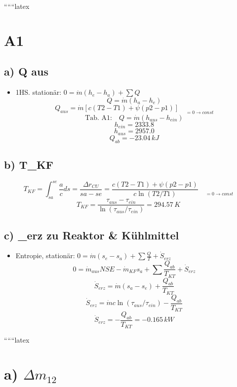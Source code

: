 
``````latex


\section*{A1}

\subsection*{a) Q aus}

\begin{itemize}
    \item 1HS. stationär: \(0 = \dot{m} (h_e - h_a) + \sum Q\)
    \[
    Q = \dot{m} (h_a - h_e)
    \]
    \[
    Q_{aus} = \dot{m} \left[ c (T2 - T1) + \psi (p2 - p1) \right] \quad \underset{=0 \rightarrow const}{}
    \]
    \[
    \text{Tab. A1:} \quad Q = \dot{m} (h_{aus} - h_{ein})
    \]
    \[
    h_{ein} = 2333.8
    \]
    \[
    h_{aus} = 2957.0
    \]
    \[
    Q_{ab} = -23.04 \, kJ
    \]
\end{itemize}

\subsection*{b) T_{KF}}

\[
T_{KF} = \int_{sa}^{se} \frac{a}{c} ds = \frac{\Delta r_{CU}}{sa - se} = \frac{c (T2 - T1) + \psi (p2 - p1)}{c \ln (T2 / T1)} \quad \underset{=0 \rightarrow const}{}
\]
\[
T_{KF} = \frac{\tau_{aus} - \tau_{ein}}{\ln (\tau_{aus} / \tau_{ein})} = 294.57 \, K
\]

\subsection*{c) _{erz} zu Reaktor \& Kühlmittel}

\begin{itemize}
    \item Entropie, stationär: \(0 = \dot{m} (s_e - s_a) + \sum \frac{Q}{T} + \dot{S}_{erz}\)
    \[
    0 = \dot{m}_{aus} NSE - \dot{m}_{KF} s_a + \sum \frac{Q_{ab}}{T_{KT}} + \dot{S}_{erz}
    \]
    \[
    \dot{S}_{erz} = \dot{m} (s_a - s_e) + \frac{Q_{ab}}{T_{KT}}
    \]
    \[
    \dot{S}_{erz} = \dot{m} c \ln (\tau_{aus} / \tau_{ein}) - \frac{Q_{ab}}{T_{KT}}
    \]
    \[
    \dot{S}_{erz} = -\frac{Q_{ab}}{T_{KT}} = -0.165 \, kW
    \]
\end{itemize}

``````latex


\section*{a) $\Delta m_{12}$}

